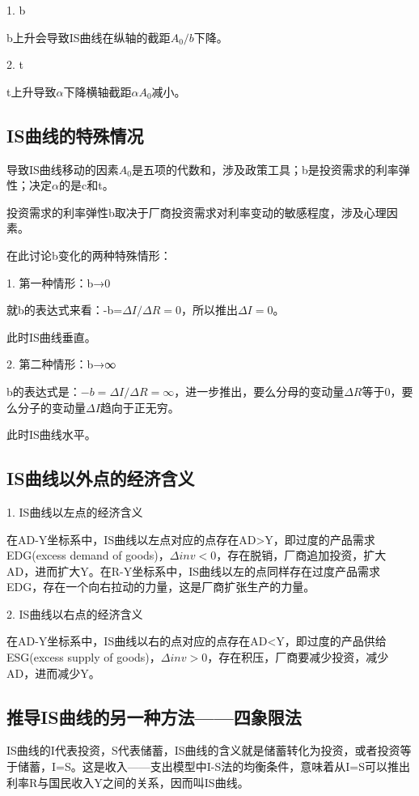 \documentclass{article}
\begin{document}
1. b

b上升会导致IS曲线在纵轴的截距$ A_0/b $下降。

\hspace*{\fill}

2. t

t上升导致$ \alpha $下降横轴截距$ \alpha A_0 $减小。

\subsection{IS曲线的特殊情况}

导致IS曲线移动的因素$ A_0 $是五项的代数和，涉及政策工具；b是投资需求的利率弹性；决定$ \alpha $的是c和t。

投资需求的利率弹性b取决于厂商投资需求对利率变动的敏感程度，涉及心理因素。

在此讨论b变化的两种特殊情形：

\hspace*{\fill}

1. 第一种情形：b→0

就b的表达式来看：-b=$ \Delta I/\Delta R=0 $，所以推出$ \Delta I=0 $。

此时IS曲线垂直。

\hspace*{\fill}

2. 第二种情形：b→∞

b的表达式是：$ -b=\Delta I/\Delta R=\infty $，进一步推出，要么分母的变动量$ \Delta R $等于0，要么分子的变动量$ \Delta I $趋向于正无穷。

此时IS曲线水平。

\subsection{IS曲线以外点的经济含义}
1. IS曲线以左点的经济含义

在AD-Y坐标系中，IS曲线以左点对应的点存在AD>Y，即过度的产品需求EDG(excess demand of goods)，$ \Delta inv<0 $，存在脱销，厂商追加投资，扩大AD，进而扩大Y。在R-Y坐标系中，IS曲线以左的点同样存在过度产品需求EDG，存在一个向右拉动的力量，这是厂商扩张生产的力量。

\hspace*{\fill}

2. IS曲线以右点的经济含义

在AD-Y坐标系中，IS曲线以右的点对应的点存在AD<Y，即过度的产品供给ESG(excess supply of goods)，$ \Delta inv>0 $，存在积压，厂商要减少投资，减少AD，进而减少Y。

\subsection{推导IS曲线的另一种方法——四象限法}
IS曲线的I代表投资，S代表储蓄，IS曲线的含义就是储蓄转化为投资，或者投资等于储蓄，I=S。这是收入——支出模型中I-S法的均衡条件，意味着从I=S可以推出利率R与国民收入Y之间的关系，因而叫IS曲线。
\end{document}

